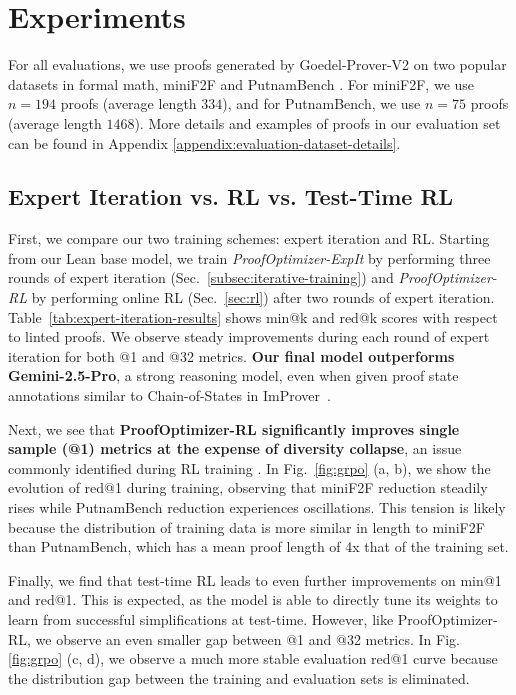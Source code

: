 \section{Experiments}
\label{sec:experiments}

For all evaluations, we use proofs generated by Goedel-Prover-V2 \citep{lin2025goedel} on two popular datasets in formal math, miniF2F \citep{zheng2021minif2f} and PutnamBench \citep{tsoukalas2024putnambench}. For miniF2F, we use $n=194$ proofs (average length $334$), and for PutnamBench, we use $n=75$ proofs (average length $1468$). More details and examples of proofs in our evaluation set can be found in Appendix \ref{appendix:evaluation-dataset-details}.

\subsection{Expert Iteration vs. RL vs. Test-Time RL}
\label{sec:expit-rl}
First, we compare our two training schemes: expert iteration and RL. Starting from our Lean base model, we train \textit{ProofOptimizer-ExpIt} by performing three rounds of expert iteration (Sec.~\ref{subsec:iterative-training}) and \textit{ProofOptimizer-RL} by performing online RL (Sec.~\ref{sec:rl}) after two rounds of expert iteration. Table~\ref{tab:expert-iteration-results} shows min@k and red@k scores with respect to linted proofs. We observe steady improvements during each round of expert iteration for both @1 and @32 metrics. \textbf{Our final model outperforms Gemini-2.5-Pro}, a strong reasoning model, even when given proof state annotations similar to Chain-of-States in ImProver~\citep{ahuja2024improver}.

Next, we see that \textbf{ProofOptimizer-RL significantly improves single sample (@1) metrics at the expense of diversity collapse}, an issue commonly identified during RL training \citep{gehring2024rlef, walder2025pass,yue2025doesreinforcementlearningreally}. In Fig.~\ref{fig:grpo} (a, b), we show the evolution of red@1 during training, observing that miniF2F reduction steadily rises while PutnamBench reduction experiences oscillations. This tension is likely because the distribution of training data is more similar in length to miniF2F than PutnamBench, which has a mean proof length of 4x that of the training set.

Finally, we find that test-time RL leads to even further improvements on min@1 and red@1. This is expected, as the model is able to directly tune its weights to learn from successful simplifications at test-time. However, like ProofOptimizer-RL, we observe an even smaller gap between @1 and @32 metrics. In Fig. \ref{fig:grpo} (c, d), we observe a much more stable evaluation red@1 curve because the distribution gap between the training and evaluation sets is eliminated. 

